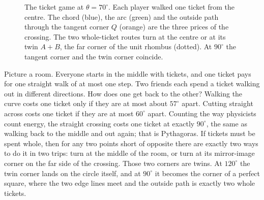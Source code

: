 \documentclass[11pt]{article}
\begin{document}
\begin{figure}[h!]\centering
{}
\caption{The ticket game at $\theta=70^\circ$. Each player walked one ticket from the
centre. The chord (blue), the arc (green) and the outside path through the tangent corner $Q$
(orange) are the three prices of the crossing. The two whole-ticket routes turn at the
centre or at its twin $A+B$, the far corner of the unit rhombus (dotted). At $90^\circ$ the
tangent corner and the twin corner coincide.}
\label{fig:tickets}
\end{figure}

\begin{plain}
Picture a room. Everyone starts in the middle with tickets, and one ticket pays for one
straight walk of at most one step. Two friends each spend a ticket walking out in
different directions. How does one get back to the other? Walking the curve costs one
ticket only if they are at most about $57^\circ$ apart. Cutting straight across costs one
ticket if they are at most $60^\circ$ apart. Counting the way physicists count energy,
the straight crossing costs one ticket at exactly $90^\circ$, the same as walking back to
the middle and out again; that is Pythagoras. If tickets must be spent whole, then for any two points short of opposite there are
exactly two ways to do it in two trips: turn at the middle of the room, or turn at
its mirror-image corner on the far side of the crossing. Those two corners are twins. At
$120^\circ$ the twin corner lands on the circle itself, and at $90^\circ$ it becomes the
corner of a perfect square, where the two edge lines meet and the outside path is exactly
two whole tickets.
\end{plain}
\end{document}
